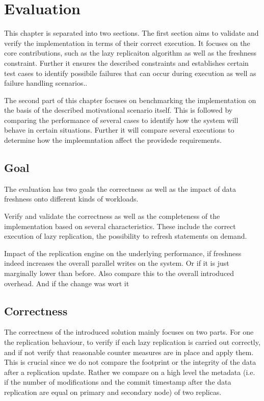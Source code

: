 \chapter{Evaluation}
\label{c:evaluation}

This chapter is separated into two sections. The first section aims to validate and verify the implementation in terms of their
correct execution. It focuses on the core contributions, such as the lazy replicaiton algorithm as well as the freshness constraint.
Further it ensures the described constraints and establishes certain test cases to identify possibile failures that can occur 
during execution as well as failure handling scenarios..

The second part of this chapter focuses on benchmarking the implementation on the basis of the described motivational scenario itself.
This is followed by comparing the performance of several cases to identify how the system will behave in certain situations.
Further it will compare several executions to determine how the impleemntation affect the providede requirements.


\section{Goal}
The evaluation has two goals the correctness as well as the impact of data freshness onto different kinds of workloads.

Verify and validate the correctness as well as the completeness of the implementation based on several characteristics.
These include the correct execution of lazy replication, the possibility to refresh statements on demand.

Impact of the replication engine on the underlying performance, if freshness indeed increases the overall parallel writes on the system.
Or if it is just marginally lower than before. Also compare this to the overall introduced overhead. And if the change was wort it



\section{Correctness}

The correctness of the introduced solution mainly focuses on two parts. For one the replication behaviour, to verify if each lazy replication is carried out correctly,
and if not verify that reasonable counter measures are in place and apply them. This is crucial since we do not compare the footprint or the integrity of the data after 
a replication update. Rather we compare on a high level the metadata 
(i.e. if the number of modifications and the commit timestamp after the data replication are equal on primary and secondary node) of two replicas. 

